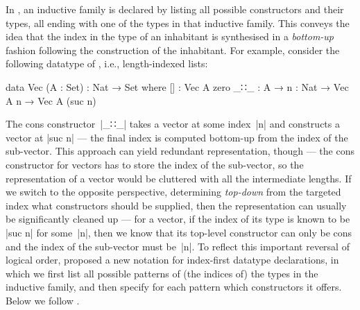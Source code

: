 In \Agda, an inductive family is declared by listing all possible constructors and their types, all ending with one of the types in that inductive family.
This conveys the idea that the index in the type of an inhabitant is synthesised in a \emph{bottom-up} fashion following the construction of the inhabitant.
For example, consider the following datatype of , i.e., length-indexed lists:
\begin{code}
data Vec (A : Set) : Nat → Set where
  []   : Vec A zero
  _∷_  : A → {n : Nat} → Vec A n → Vec A (suc n)
\end{code}
The cons constructor~|_∷_| takes a vector at some index~|n| and constructs a vector at |suc n| --- the final index is computed bottom-up from the index of the sub-vector.
This approach can yield redundant representation, though --- the cons constructor for vectors has to store the index of the sub-vector, so the representation of a vector would be cluttered with all the intermediate lengths.
If we switch to the opposite perspective, determining \emph{top-down} from the targeted index what constructors should be supplied, then the representation can usually be significantly cleaned up --- for a vector, if the index of its type is known to be |suc n| for some~|n|, then we know that its top-level constructor can only be cons and the index of the sub-vector must be~|n|.
To reflect this important reversal of logical order, \citet{Dagand-functional-ornaments} proposed a new notation for index-first datatype declarations, in which we first list all possible patterns of (the indices of) the types in the inductive family, and then specify for each pattern which constructors it offers.
Below we follow .

